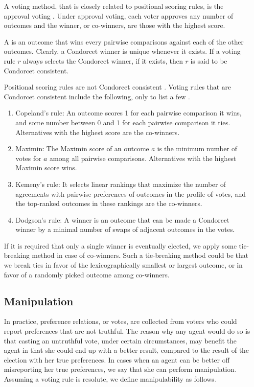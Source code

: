 A voting method, that is closely related to positional scoring rules, is
the approval voting \cite{BraFis}.
Under approval voting, each voter approves any number of outcomes
and the winner, or co-winners, are those with the highest score.

A  is an outcome that wins every pairwise comparisons
against each of the other outcomes.
Clearly, a Condorcet winner is unique whenever it exists.
If a voting rule $r$ always selects the Condorcet winner,
if it exists, then $r$ is said to be Condorcet consistent.

Positional scoring rules are not Condorcet consistent \cite{Fis}.
Voting rules that are Condorcet consistent include the following,
only to list a few \cite{Brandt:COMSOC}.
\begin{enumerate} \itemsep -4pt
	\item Copeland's rule: An outcome scores 1 for each pairwise comparison
				it wins, and some number between 0 and 1 for each pairwise comparison
				it ties.  Alternatives with the highest score are the co-winners.
	\item Maximin: The Maximin score of an outcome $a$ is the minimum number of
				votes for $a$ among all pairwise comparisons.  
				Alternatives with the highest Maximin score wins.
	\item Kemeny's rule: It selects linear rankings that maximize the number of agreements 
				with pairwise preferences of outcomes in the profile of votes, and
				the top-ranked outcomes in these rankings are the co-winners.
	\item Dodgson's rule: A winner is an outcome that can be made a Condorcet winner 
				by a minimal number of swaps of adjacent outcomes in the votes.
\end{enumerate}

If it is required that only a single winner is eventually elected,
we apply some tie-breaking method in case of co-winners.
Such a tie-breaking method could be that we break ties in favor of
the lexicographically smallest or largest outcome, or in favor of
a randomly picked outcome among co-winners.







\subsection{Manipulation \label{sec:manip}}
In practice, preference relations, or votes, are collected from voters
who could report preferences that are not truthful.
The reason why any agent would do so is that
casting an untruthful vote, under certain circumstances,
may benefit the agent in that she could end up with
a better result, compared to the result of the election
with her true preferences.
In cases when an agent can be better off misreporting her
true preferences, we say that she can perform manipulation.
Assuming a voting rule is resolute,
we define manipulability as follows.

